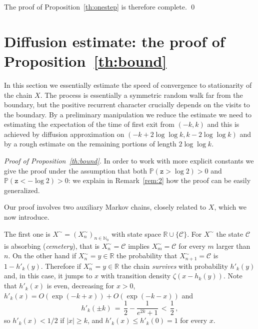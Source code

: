 \documentclass[reqno,11pt]{amsart}
\numberwithin{equation}{section}
\newcommand{\cC}{{\ensuremath{\mathcal C}} }
\newcommand{\bbN}{{\ensuremath{\mathbb N}} }
\newcommand{\bbP}{{\ensuremath{\mathbb P}} }
\newcommand{\bbR}{{\ensuremath{\mathbb R}} }
\newcommand{\gz}{\zeta}
\newcommand{\logZ}{\mathtt{z}}
\begin{document}
 
 
The proof of Proposition~\ref{th:onestep} is therefore complete.
\qed

 


\section{Diffusion estimate: the proof of Proposition~\ref{th:bound}}
\label{sec:bound}



In this section we essentially estimate the speed of convergence to stationarity of the chain $X$. The process is essentially a symmetric random walk far from the boundary, but the positive recurrent character crucially depends on the visits to the boundary. By a preliminary manipulation we reduce the estimate we need to estimating the expectation of the time of first exit from $(-k,k)$ and this is achieved by  diffusion approximation 
on $(-k+ 2 \log \log k, k-2 \log \log k)$ and by a rough estimate on the  remaining portions of length $2\log \log k$. 

\medskip



\noindent
\emph{Proof of Proposition~\ref{th:bound}.} 
In order to work with more explicit constants we give the proof under the assumption that 
both $\bbP(\logZ > \log 2)>0$ and $\bbP(\logZ < -\log 2 )>0$: we explain in Remark~\ref{rem:2} how the proof can be easily generalized.

\medskip
Our proof involves two auxiliary Markov chains, closely related to $X$, which we now introduce.

The first one is  $X^\sim=(X^\sim_n)_{n\in\bbN_0}$ with state space $\bbR\cup \{\cC\}$. For $X^\sim$  the state $\cC$ is absorbing (\emph{cemetery}), that is $X^\sim_n=\cC$ implies $X^\sim_m=\cC$ for every $m$ larger than $n$. 
On the other hand if $X^\sim_n =y \in \bbR$ the probability that $X^\sim_{n+1}= \cC$ is $1-h'_k(y)$.
Therefore if $X^\sim_n =y \in \bbR$ the chain \emph{survives} with probability $h'_k(y)$ and, in this case, it jumps to $x$ 
with transition density $\gz(x-h_k(y))$. Note that $h'_k(x)$ is even, decreasing for $x>0$,
$h'_k(x)= O(\exp(-k+x))+ O(\exp(-k-x))$ and 
\begin{equation}
\label{eq:1/2}
h'_k(\pm k)\, =\, \frac 1 2 - \frac{1}{e^{2k}+1} \, < \, \frac 12\,,
\end{equation}
so $h'_k(x) < 1/2$ if $\vert x\vert \ge k$, and $h'_k(x) \le h'_k(0)=1$ for every $x$. 
\end{document}

